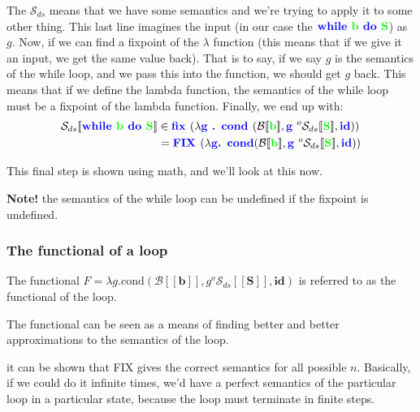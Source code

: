 \documentclass[11pt,a4paper,titlepage,dvipsnames,cmyk]{scrartcl}
\begin{document}
The $\mathcal{S}_{ds}$ means that we have some semantics and we're trying
to apply it to some other thing. This last line imagines the input (in our
case the ${\color{blue}\textbf{while }} {\color{green} \textbf{b }}
{\color{blue} \textbf{do }} {\color{green} \textbf{S}}$) as $g$. Now, if
we can find a fixpoint of the $\lambda$ function (this means that if we
give it an input, we get the same value back). That is to say, if we say
$g$ is the semantics of the while loop, and we pass this into the
function, we should get $g$ back. This means that if we define the lambda
function, the semantics of the while loop must be a fixpoint of the lambda
function. Finally, we end up with:
\begin{align*}
\mathcal{S}_{ds}[\![ {\color{blue}\textbf{while }} {\color{green}
    \textbf{b }} {\color{blue} \textbf{do }} {\color{green} \textbf{S}}
    ]\!] &\in {\color{blue} \textbf{fix }} ( \lambda {\color{blue} \textbf{g . cond }} ( \mathcal{B} [\![ {\color{green} \textbf{b}} ]\!], {\color{blue}
\textbf{g }} ^o \mathcal{S}_{ds}[\![ {\color{green} \textbf{S}} ]\!],
{\color{blue} \textbf{id}})) \\
         &= {\color{blue} \textbf{FIX }} ( \lambda {\color{blue}
         \textbf{g. cond}} ( \mathcal{B} [\![ {\color{green} \textbf{b}}]\!],
         {\color{blue} \textbf{g }} ^o \mathcal{S}_{ds}[\![
         {\color{green} \textbf{S}} ]\!], {\color{blue} \textbf{id}} ))
\end{align*}

This final step is shown using math, and we'll look at this now.

\textbf{Note!} the semantics of the while loop can be undefined if the
fixpoint is undefined.

\subsubsection{The functional of a loop}%
\label{ssub:The functional of a loop}
The functional $F = \lambda g . \text{cond}( \mathcal{B} [\![ \textbf{b}
]\!], g ^o \mathcal{S}_{ds}[\![ \textbf{S} ]\!], \textbf{id} )$ is
referred to as the functional of the loop.

The functional can be seen as a means of finding better and better
approximations to the semantics of the loop.

it can be shown that FIX gives the correct semantics for all possible $n$.
Basically, if we could do it infinite times, we'd have a perfect semantics
of the particular loop in a particular state, because the loop must
terminate in finite steps.
\end{document}
